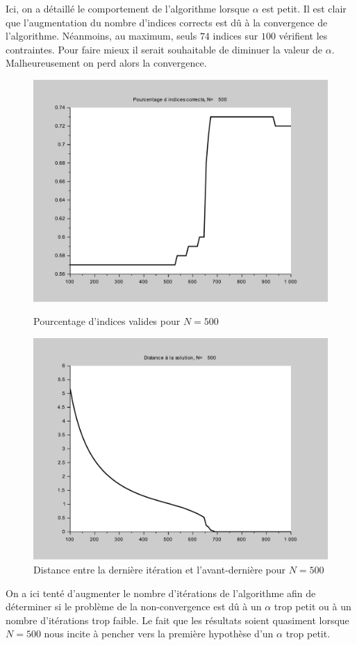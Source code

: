 \documentclass[10pt,a4paper]{article}
\begin{document}
Ici, on a détaillé le comportement de l'algorithme lorsque $\alpha$ est petit.
Il est clair que l'augmentation du nombre d'indices corrects est dû à la convergence de l'algorithme.
Néanmoins, au maximum, seuls $74$ indices sur $100$ vérifient les contraintes.
Pour faire mieux il serait souhaitable de diminuer la valeur de $\alpha$.
Malheureusement on perd alors la convergence.
\begin{figure}[H]
\centering
\begin{minipage}[b]{.46\linewidth}
\centering
\includegraphics[scale=0.3]{percent_alpha1_500.pdf}
\caption{Pourcentage d'indices valides pour $N=500$}
\end{minipage}
\begin{minipage}[b]{.46\linewidth}
\centering
\includegraphics[scale=0.3]{dist_alpha1_500.pdf}
\caption{Distance entre la dernière itération et l'avant-dernière pour $N=500$}
\end{minipage}
\end{figure}
On a ici tenté d'augmenter le nombre d'itérations de l'algorithme afin de déterminer si le problème de la non-convergence est dû à un $\alpha$ trop petit ou à un nombre d'itérations trop faible.
Le fait que les résultats soient quasiment lorsque $N=500$ nous incite à pencher vers la première hypothèse d'un $\alpha$ trop petit.


\end{document}
